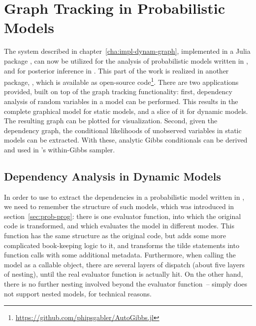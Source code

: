 \chapter{Graph Tracking in Probabilistic Models}
\label{cha:graph-track-prob}

The system described in chapter~\ref{cha:impl-dynam-graph}, implemented in a Julia package
\irtrackerjl{}, can now be utilized for the analysis of probabilistic models written in \dppljl{},
and for posterior inference in \turingjl{}.  This part of the work is realized in another package,
\autogibbsjl{}, which is available as open-source
code\footnote{\url{https://github.com/phipsgabler/AutoGibbs.jl}}.  There are two applications
provided, built on top of the graph tracking functionality: first, dependency analysis of random
variables in a model can be performed.  This results in the complete graphical model for static
models, and a slice of it for dynamic models.  The resulting graph can be plotted for visualization.
Second, given the dependency graph, the conditional likelihoods of unobserved variables in static
models can be extracted.  With these, analytic Gibbs conditionals can be derived and used in
\turingjl{}'s within-Gibbs sampler.

\section{Dependency Analysis in Dynamic Models}
\label{sec:dependency-analysis}

In order to use \irtrackerjl{} to extract the dependencies in a probabilistic model written in
\dppljl{}, we need to remember the structure of such models, which was introduced in
section~\ref{sec:prob-prog}: there is one evaluator function, into which the original code is
transformed, and which evaluates the model in different modes.  This function has the same structure
as the original code, but adds some more complicated book-keeping logic to it, and transforms the
tilde statements into function calls with some additional metadata.  Furthermore, when calling the
model as a callable object, there are several layers of dispatch (about five layers of nesting),
until the real evaluator function is actually hit.  On the other hand, there is no further nesting
involved beyond the evaluator function~-- \turingjl{} simply does not support nested models, for
technical reasons.

